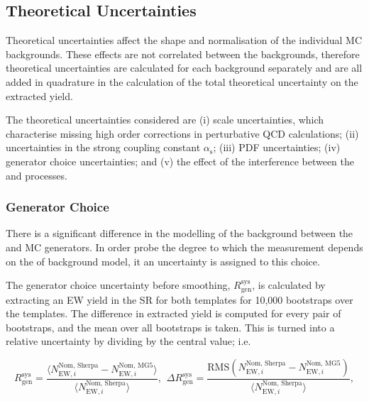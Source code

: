 \subsection{Theoretical Uncertainties}\label{sec:vbswy:theoryunc}

Theoretical uncertainties affect the shape and normalisation of the individual MC backgrounds. These effects are not correlated between the backgrounds, therefore theoretical uncertainties are calculated for each background separately and are all added in quadrature in the calculation of the total theoretical uncertainty on the extracted \ewwy yield.

The theoretical uncertainties considered are (i) scale uncertainties, which characterise missing high order corrections in perturbative QCD calculations; (ii) uncertainties in the strong coupling constant $\alpha_\mathrm{s}$; (iii) PDF uncertainties; (iv) generator choice uncertainties; and (v) the effect of the interference between the \qcdwy and \ewwy processes.
 
\subsubsection{\Qcdwy Generator Choice}\label{sec:genchoiceextraction}

There is a significant difference in the modelling of the \qcdwy background between the \SHERPA and \MADGRAPH MC generators. In order probe the degree to which the measurement depends on the of background model, it an uncertainty is assigned to this choice. 

The \qcdwy generator choice uncertainty before smoothing, $R^{\text{sys}}_{\text{gen}}$, is calculated by extracting an EW yield in the SR for both \qcdwy templates for 10,000 bootstraps over the \qcdwy templates. The difference in extracted yield is computed for every pair of bootstraps, and the mean over all bootstraps is taken. This is turned into a relative uncertainty by dividing by the central value; i.e. 

\begin{equation}\label{eq:genchoicetheory}
  R^{\text{sys}}_{\text{gen}} = \frac{\langle N_{\text{EW},i}^{\text{Nom, Sherpa}}-N_{\text{EW},i}^{\text{Nom, MG5}}\rangle}{\langle N_{\text{EW},i}^{\text{Nom, Sherpa}}\rangle}, \hspace{5pt} \Delta R^{\text{sys}}_{\text{gen}} = \frac{\text{RMS}(N_{\text{EW},i}^{\text{Nom, Sherpa}}-N_{\text{EW},i}^{\text{Nom, MG5}})}{\langle N_{\text{EW},i}^{\text{Nom, Sherpa}}\rangle},
\end{equation}

